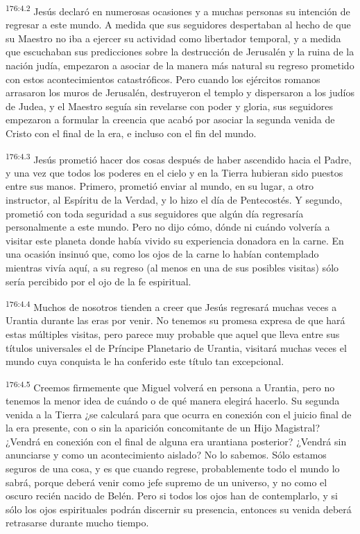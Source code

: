 \par 
\textsuperscript{176:4.2} Jesús declaró en numerosas ocasiones y a muchas personas su intención de regresar a este mundo. A medida que sus seguidores despertaban al hecho de que su Maestro no iba a ejercer su actividad como libertador temporal, y a medida que escuchaban sus predicciones sobre la destrucción de Jerusalén y la ruina de la nación judía, empezaron a asociar de la manera más natural su regreso prometido con estos acontecimientos catastróficos. Pero cuando los ejércitos romanos arrasaron los muros de Jerusalén, destruyeron el templo y dispersaron a los judíos de Judea, y el Maestro seguía sin revelarse con poder y gloria, sus seguidores empezaron a formular la creencia que acabó por asociar la segunda venida de Cristo con el final de la era, e incluso con el fin del mundo.

\par 
\textsuperscript{176:4.3} Jesús prometió hacer dos cosas después de haber ascendido hacia el Padre, y una vez que todos los poderes en el cielo y en la Tierra hubieran sido puestos entre sus manos. Primero, prometió enviar al mundo, en su lugar, a otro instructor, al Espíritu de la Verdad, y lo hizo el día de Pentecostés. Y segundo, prometió con toda seguridad a sus seguidores que algún día regresaría personalmente a este mundo. Pero no dijo cómo, dónde ni cuándo volvería a visitar este planeta donde había vivido su experiencia donadora en la carne. En una ocasión insinuó que, como los ojos de la carne lo habían contemplado mientras vivía aquí, a su regreso (al menos en una de sus posibles visitas) sólo sería percibido por el ojo de la fe espiritual.

\par 
\textsuperscript{176:4.4} Muchos de nosotros tienden a creer que Jesús regresará muchas veces a Urantia durante las eras por venir. No tenemos su promesa expresa de que hará estas múltiples visitas, pero parece muy probable que aquel que lleva entre sus títulos universales el de Príncipe Planetario de Urantia, visitará muchas veces el mundo cuya conquista le ha conferido este título tan excepcional.

\par 
\textsuperscript{176:4.5} Creemos firmemente que Miguel volverá en persona a Urantia, pero no tenemos la menor idea de cuándo o de qué manera elegirá hacerlo. Su segunda venida a la Tierra ¿se calculará para que ocurra en conexión con el juicio final de la era presente, con o sin la aparición concomitante de un Hijo Magistral? ¿Vendrá en conexión con el final de alguna era urantiana posterior? ¿Vendrá sin anunciarse y como un acontecimiento aislado? No lo sabemos. Sólo estamos seguros de una cosa, y es que cuando regrese, probablemente todo el mundo lo sabrá, porque deberá venir como jefe supremo de un universo, y no como el oscuro recién nacido de Belén. Pero si todos los ojos han de contemplarlo, y si sólo los ojos espirituales podrán discernir su presencia, entonces su venida deberá retrasarse durante mucho tiempo.

